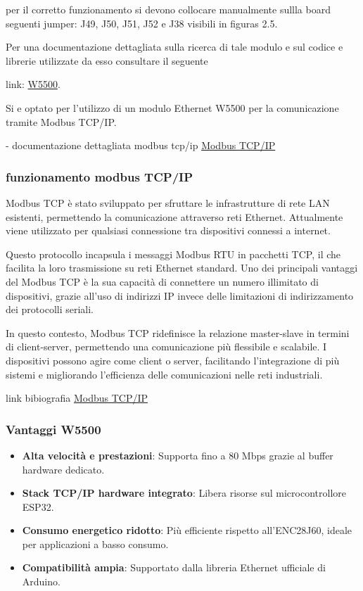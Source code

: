 \documentclass[12pt,a4paper]{report}
\begin{document}
per il corretto funzionamento si devono collocare manualmente sullla board seguenti jumper: J49, J50, J51, J52 e J38 visibili in figuras 2.5.


Per una documentazione dettagliata sulla ricerca di tale modulo e sul codice e librerie utilizzate da esso consultare il seguente 

link: \href{https://github.com/AlessioTommasi-supsi/iotProject/blob/main/docs/ResearchEthModule/W5500Example/README.md}{W5500}.

Si e optato per l'utilizzo di un modulo Ethernet W5500 per la comunicazione tramite Modbus TCP/IP.

- documentazione dettagliata modbus tcp/ip \href{https://www.modbus.org/docs/Modbus_Messaging_Implementation_Guide_V1_0b.pdf}{Modbus TCP/IP}

\subsubsection{funzionamento modbus TCP/IP }
Modbus TCP è stato sviluppato per sfruttare le infrastrutture di rete LAN esistenti, permettendo la comunicazione attraverso reti Ethernet. Attualmente viene utilizzato per qualsiasi connessione tra dispositivi connessi a internet.

Questo protocollo incapsula i messaggi Modbus RTU in pacchetti TCP, il che facilita la loro trasmissione su reti Ethernet standard. Uno dei principali vantaggi del Modbus TCP è la sua capacità di connettere un numero illimitato di dispositivi, grazie all’uso di indirizzi IP invece delle limitazioni di indirizzamento dei protocolli seriali.

In questo contesto, Modbus TCP ridefinisce la relazione master-slave in termini di client-server, permettendo una comunicazione più flessibile e scalabile. I dispositivi possono agire come client o server, facilitando l’integrazione di più sistemi e migliorando l’efficienza delle comunicazioni nelle reti industriali.

link bibiografia \href{https://v2charge.com/it/che-cose-modbus-rtu-tpc/}{Modbus TCP/IP}

\subsubsection{Vantaggi W5500}
\begin{itemize}
    \item \textbf{Alta velocità e prestazioni}: Supporta fino a 80 Mbps grazie al buffer hardware dedicato.
    \item \textbf{Stack TCP/IP hardware integrato}: Libera risorse sul microcontrollore ESP32.
    \item \textbf{Consumo energetico ridotto}: Più efficiente rispetto all’ENC28J60, ideale per applicazioni a basso consumo.
    \item \textbf{Compatibilità ampia}: Supportato dalla libreria Ethernet ufficiale di Arduino.
\end{itemize}
\end{document}
